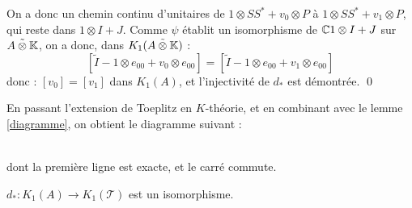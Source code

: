 \begin{dem}
On a donc un chemin continu d'unitaires de $1\otimes SS^*+v_0\otimes P$ à $1\otimes SS^*+v_1\otimes P$, qui reste dans $1\otimes I +J$. Comme $\psi$ établit un isomorphisme de $\mathbb C1\otimes I +J$ sur $\tilde{A\otimes \mathbb K}$, on a donc, dans $K_1(\tilde{A\otimes \mathbb K})$ :
\[[\tilde{I}-1\otimes e_{00}+v_0\otimes e_{00} ]=[ \tilde{I}-1\otimes e_{00}+v_1\otimes e_{00}]\]
donc : $[v_0]=[v_1]$ dans $K_1(A)$, et l'injectivité de $d_*$ est démontrée.
\qed\\
\end{dem}

En passant l'extension de Toeplitz en $K$-théorie, et en combinant avec le lemme \ref{diagramme}, on obtient le diagramme suivant :\\

\\

dont la première ligne est exacte, et le carré commute.\\

\begin{lem}\label{isom} $d_* : K_1(A)\rightarrow K_1(\mathcal T)$ est un isomorphisme.\end{lem} 

